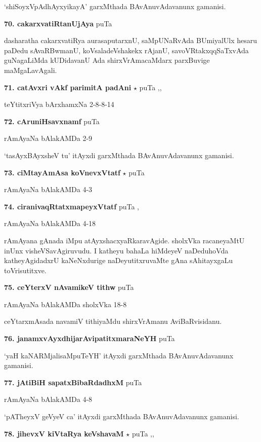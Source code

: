 \hfill `shiSoyxVpAdhAyxyikayA' garxMthada BAvAnuvAdavanunx gamanisi.

\medskip
\noindent\textbf{70. cakarxvatiRtanUjAya}  \hfill puTa \pageref{193}

dasharatha cakarxvatiRya aurasaputarxnU, saMpUNaRvAda BUmiyalUlx hesaru paDedu sAvaRBwmanU, koVsaladeVshakekx rAjanU, savoVRtakxqqSaTxvAda guNagaLiMda kUDidavanU Ada shirxVrAmacaMdarx parxBuvige maMgaLavAgali.

\medskip
\noindent\textbf{71. catAvxri vAkf parimitA padAni} $\star$ \hfill puTa \pageref{22},\pageref{153b},\pageref{252}

\hfill teYtitxriVya bArxhamxNa 2-8-8-14

\medskip
\noindent\textbf{72. cAruniHsavxnamf} \hfill puTa \pageref{250}

\hfill rAmAyaNa bAlakAMDa 2-9

`tasAyxBAyxsheV tu' itAyxdi garxMthada BAvAnuvAdavanunx gamanisi.

\medskip
\noindent\textbf{73. ciMtayAmAsa koVnevxVtatf} $\star$ \hfill puTa \pageref{158a}

\hfill rAmAyaNa bAlakAMDa 4-3

\medskip
\noindent\textbf{74. ciranivaqRtatxmapeyxVtatf} \hfill puTa \pageref{204b},\pageref{243}

\hfill rAmAyaNa bAlakAMDa 4-18

rAmAyana gAnada iMpu atAyxshacxyaRkaravAgide. sholxVka racaneyaMtU inUnx visheVSavAgiruvudu. I katheyu bahaLa hiMdeyeV naDeduhoVda katheyAgidadxrU kaNeNxdurige naDeyutitxruvaMte gAna sAhitayxgaLu toVrisutitxve.

\medskip
\noindent\textbf{75. ceYterxV nAvamikeV tithw} \hfill puTa \pageref{147}

\hfill rAmAyaNa bAlakAMDa sholxVka 18-8

ceYtarxmAsada navamiV tithiyaMdu shirxVrAmanu AviBaRvisidanu.

\medskip
\noindent\textbf{76. janamxvAyxdhijarAvipatitxmaraNeYH} \hfill puTa \pageref{173}

`yaH kaNARMjalisaMpuTeYH' itAyxdi garxMthada BAvAnuvAdavanunx gamanisi.

\medskip
\noindent\textbf{77. jAtiBiH sapatxBibaRdadhxM} \hfill puTa \pageref{212}

\hfill rAmAyaNa bAlakAMDa 4-8

`pATheyxV geVyeV ca' itAyxdi garxMthada BAvAnuvAdavanunx gamanisi.

\medskip
\noindent\textbf{78. jihevxV kiVtaRya keVshavaM} $\star$ \hfill puTa \pageref{214},\pageref{232d},\pageref{271}

